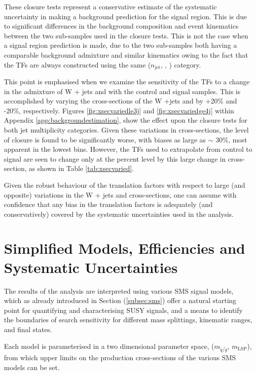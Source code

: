 These closure tests represent a conservative estimate of the systematic uncertainty in making a background prediction for the signal region. This is due to significant differences in the background composition and event kinematics between the two sub-samples used in the closure tests. This is not the case when a signal region prediction is made, due to the two sub-samples both having a comparable background admixture and similar kinematics owing to the fact that the \ac{TF}s are always constructed using the same ($n_{\text{jet}}$, \nbreco, \theht) category.

This point is emphasised when we examine the sensitivity of the \ac{TF}s to a change in the admixture of W + jets and \ttbar with the control and signal samples. This is accomplished by varying the cross-sections of the W +jets and \ttbar by +20\% and -20\%, respectively. Figures \ref{fig:xsecvariedle3j} and \ref{fig:xsecvariedge4j} within Appendix \ref{app:backgroundestimation}, show the effect upon the closure tests for both jet multiplicity categories. Given these variations in cross-sections, the level of closure is found to be significantly worse, with biases as large as $\sim$ 30\%, most apparent in the lowest \theht bins. However, the \ac{TF}s used to extrapolate from control to signal are seen to change only at the percent level by this large change in cross-section, as shown in Table \ref{tab:xsecvaried}.

Given the robust behaviour of the translation factors with respect to large (and opposite) variations in the W + jets and \ttbar cross-sections, one can assume with confidence that any bias in the translation factors is adequately (and conservatively) covered by the systematic uncertainties used in the analysis.

\section{Simplified Models, Efficiencies and Systematic Uncertainties}
\label{sec:smsmodels}

The results of the analysis are interpreted using various \ac{SMS} signal models, which as already introduced in Section (\ref{subsec:sms}) offer a natural starting point for quantifying and characterising \ac{SUSY} signals, and a means to identify the boundaries of search sensitivity for different mass splittings, kinematic ranges, and final states. 

Each model is parameterised in a two dimensional parameter space, ($m_{\widetilde{q}/\widetilde{g}}$, $m_{\text{LSP}}$), from which upper limits on the production cross-sections of the various \ac{SMS} models can be set.

